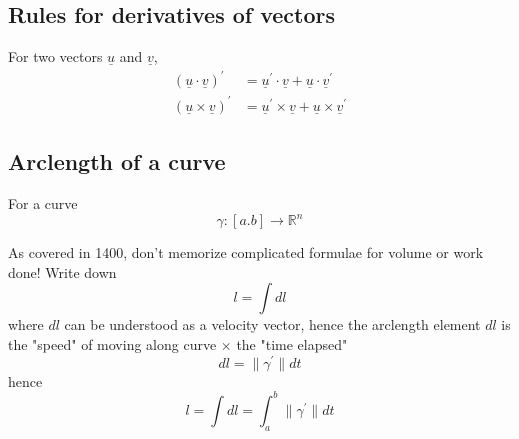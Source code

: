 \subsection{Rules for derivatives of vectors}
\begin{framed}

   For two vectors $ \underline{ u}$ and $ \underline{v}$, 
   \begin{align*}
      \left( \underline{ u} \cdot \underline{v} \right) ^{\prime} &= \underline{u} ^{\prime} \cdot \underline{v} + \underline{u} \cdot \underline{v} ^{\prime} \\
      \left( \underline{ u} \times \underline{v} \right) ^{\prime} &= \underline{u} ^{\prime} \times \underline{v} + \underline{u} \times \underline{v} ^{\prime}
   \end{align*}
\end{framed}

\subsection{Arclength of a curve}
\begin{framed}
   For a curve \[
      \gamma: [a. b] \rightarrow \mathbb{R}^n
   \] 

   As covered in 1400, don't memorize complicated formulae for volume or work done! Write down \[
     l = \int dl
   \] where $dl$ can be understood as a velocity vector, hence the arclength element $dl$ is the "speed" of moving along curve $\times$ the "time elapsed" \[
     dl = \lVert \gamma ^{\prime} \rVert dt
   \] hence \[
   l = \int dl = \int_{a}^{b} \lVert \gamma ^{\prime} \rVert dt
   \] 


  
\end{framed}













